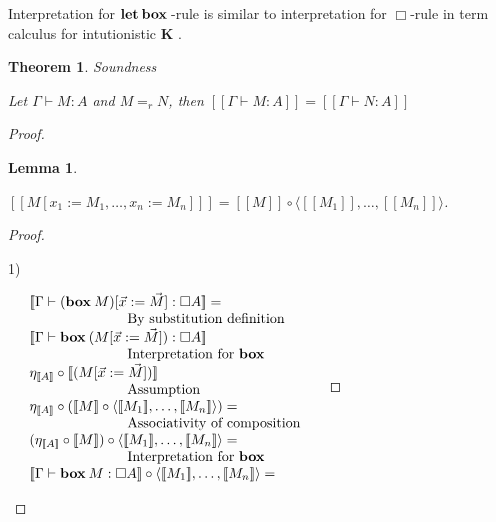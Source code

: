 \documentclass[a4paper]{article}
\newtheorem{theorem}{Theorem}
\newtheorem{lemma}{Lemma}
\begin{document}
Interpretation for ${\bf let \: box\:}$-rule is similar to interpretation for $\Box$-rule in term calculus for intutionistic {\bf K} \cite{Paiva}.

\begin{theorem} Soundness

  Let $\Gamma \vdash M : A$ and $M =_r N$, then $[\![\Gamma \vdash M : A]\!] = [\![\Gamma \vdash N : A]\!]$
\end{theorem}

\begin{proof}


\begin{lemma}
$ $

$[\![M [x_1 := M_1,\dots, x_n := M_n]]\!] = [\![M]\!] \circ \langle [\![M_1]\!], \dots, [\![M_n]\!] \rangle$.

\end{lemma}

\begin{proof}

$ $

1)

$\begin{array}{lll}
& [\![\Gamma \vdash ({\bf box \:} M) [ \vec{x} := \vec{M}] : \Box A]\!] = & \\
&\quad\quad\quad\quad\quad\quad\quad \text{By substitution definition}& \\
&[\![ \Gamma \vdash {\bf box \:} (M [ \vec{x} := \vec{M}]) : \Box A]\!]& \\
&\quad\quad\quad\quad\quad\quad\quad \text{Interpretation for {\bf box}}\\
&\eta_{[\![A]\!]} \circ [\![(M [ \vec{x} := \vec{M}])]\!]& \\
&\quad\quad\quad\quad\quad\quad\quad \text{Assumption} \\
&\eta_{[\![A]\!]} \circ ([\![M]\!] \circ \langle [\![M_1]\!], \dots, [\![M_n]\!] \rangle) = & \\
&\quad\quad\quad\quad\quad\quad\quad \text{Associativity of composition}&\\
&(\eta_{[\![A]\!]} \circ [\![M]\!]) \circ \langle [\![M_1]\!], \dots, [\![M_n]\!] \rangle = & \\
&\quad\quad\quad\quad\quad\quad\quad  \text{Interpretation for {\bf box}}& \\
&[\![ \Gamma \vdash {\bf box \:} M : \Box A]\!] \circ \langle [\![M_1]\!], \dots, [\![M_n]\!] \rangle = & \\
\end{array}$

\vspace{\baselineskip}


\end{proof}
\end{proof}
\end{document}
